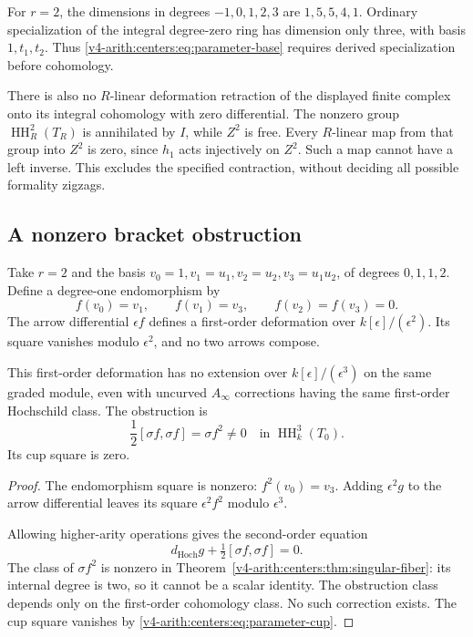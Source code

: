 For $r=2$, the dimensions in degrees
$-1,0,1,2,3$ are $1,5,5,4,1$.
Ordinary specialization of the integral
degree-zero ring has dimension only
three, with basis $1,t_1,t_2$.
Thus \eqref{v4-arith:centers:eq:parameter-base}
requires derived specialization before
cohomology.

There is also no $R$-linear deformation
retraction of the displayed finite
complex onto its integral cohomology
with zero differential. The nonzero
group $\operatorname{HH}^2_R(T_R)$ is
annihilated by $I$, while $Z^2$ is
free. Every $R$-linear map from that
group into $Z^2$ is zero, since $h_1$
acts injectively on $Z^2$. Such a map
cannot have a left inverse.
This excludes the specified contraction,
without deciding all possible formality
zigzags.

\subsection{A nonzero bracket obstruction}
\label{v4-arith:centers:subsec:parameter-obstruction}

Take $r=2$ and the basis
$v_0=1,v_1=u_1,v_2=u_2,v_3=u_1u_2$,
of degrees $0,1,1,2$. Define a degree-one
endomorphism by
\[
 f(v_0)=v_1,\qquad f(v_1)=v_3,\qquad
 f(v_2)=f(v_3)=0.
\]
The arrow differential $\epsilon f$
defines a first-order deformation over
$k[\epsilon]/(\epsilon^2)$.
Its square vanishes modulo $\epsilon^2$,
and no two arrows compose.

\begin{proposition}\label{v4-arith:centers:prop:parameter-obstruction}
This first-order deformation has no
extension over $k[\epsilon]/(\epsilon^3)$
on the same graded module, even with
uncurved $A_\infty$ corrections having
the same first-order Hochschild class.
The obstruction is
\[
 \frac12[\sigma f,\sigma f]=\sigma f^2
 \ne0\quad\text{in }\operatorname{HH}^3_k(T_0).
\]
Its cup square is zero.
\end{proposition}

\begin{proof}
The endomorphism square is nonzero:
$f^2(v_0)=v_3$. Adding $\epsilon^2g$
to the arrow differential leaves its
square $\epsilon^2f^2$ modulo
$\epsilon^3$.

Allowing higher-arity operations gives
the second-order equation
\[
 d_{\mathrm{Hoch}}g+
 \tfrac12[\sigma f,\sigma f]=0.
\]
The class of $\sigma f^2$ is nonzero
in Theorem~\ref{v4-arith:centers:thm:singular-fiber}:
its internal degree is two, so it
cannot be a scalar identity.
The obstruction class depends only
on the first-order cohomology class.
No such correction exists. The cup
square vanishes by
\eqref{v4-arith:centers:eq:parameter-cup}.
\end{proof}

